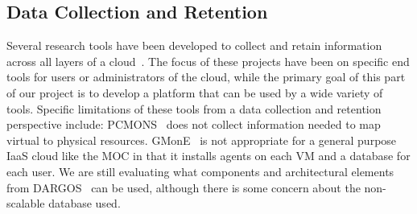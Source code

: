 \subsection{Data Collection and Retention}



Several research tools have been developed to collect and retain information across all layers of  a cloud~\cite{chaves2011toward,montes2013gmone,povedano2013dargos,alcaraz2015monpaas}.  
The focus of these projects have been on specific end tools for users or administrators of the cloud, while the primary goal of this part of our project is to develop a platform that can be used by a wide variety of tools.   Specific limitations of these tools from a data collection and retention perspective include:  PCMONS~\cite{chaves2011toward}  does not collect information needed to map virtual to physical resources. GMonE~\cite{montes2013gmone} is not appropriate for a general purpose IaaS cloud like the MOC in that it installs agents on each VM and a database for each user.  We are still evaluating what components and architectural elements from DARGOS~\cite{povedano2013dargos} can be used, although there is some concern about the non-scalable database used. 

